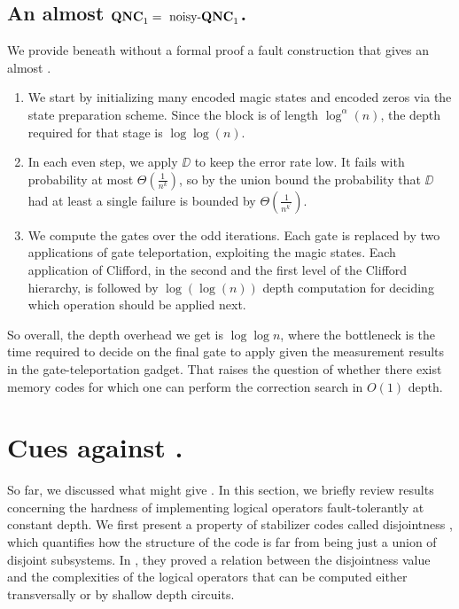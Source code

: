 \documentclass[manuscript,screen,review]{acmart}
\begin{document}
{  \subsection{An almost $\mathbf{QNC}_{1}{} = \text{ noisy-}\mathbf{QNC}_{1}{} $.}
  We provide beneath without a formal proof a fault construction that gives an almost \CDO. 
  \begin{enumerate}
    \item We start by initializing many encoded magic states and encoded zeros via the state preparation scheme. Since the block is of length $\log^{\alpha}(n)$, the depth required for that stage is $\log\log(n)$.
    \item In each even step, we apply $\DD$ to keep the error rate low. It fails with probability at most $\Theta\left(\frac{1}{n^k}\right)$, so by the union bound the probability that $\DD$ had at least a single failure is bounded by $\Theta(\frac{1}{n^{k^{\prime}}})$.
    \item We compute the gates over the odd iterations. Each gate is replaced by two applications of gate teleportation, exploiting the magic states. Each application of Clifford, in the second and the first level of the Clifford hierarchy, is followed by $\log(\log (n))$ depth computation for deciding which operation should be applied next.
  \end{enumerate}
So overall, the depth overhead we get is $\log \log n$, where the bottleneck is the time required to decide on the final gate to apply given the measurement results in the gate-teleportation gadget. That raises the question of whether there exist memory codes for which one can perform the correction search in $O(1)$ depth. \cite{Gu_2024}

  \section{ Cues against \CDO.  }\label{sec:passi}
So far, we discussed what might give \CDO. In this section, we briefly review results concerning the hardness of implementing logical operators fault-tolerantly at constant depth. 
We first present a property of stabilizer codes called disjointness \cite{Jochym_O_Connor_2018} \cite{bostanci2021findingdisjointnessstabilizercodes}, which quantifies how the structure of the code is far from being just a union of disjoint subsystems. In \cite{Jochym_O_Connor_2018}, they proved a relation between the disjointness value and the complexities of the logical operators that can be computed either transversally or by shallow depth circuits.


}
\end{document}
